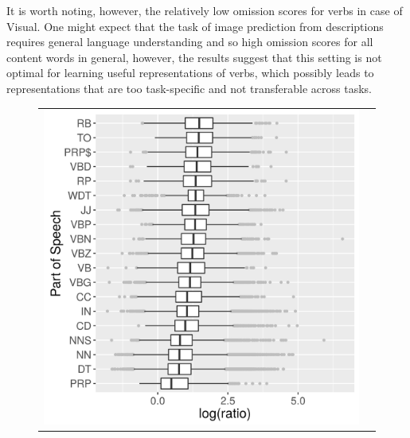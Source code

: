 It is worth noting, however, the relatively low omission scores for verbs in case \label{edit:generality}
of {\sc Visual}. One might expect that the task of image prediction from
descriptions requires general language understanding and so high omission
scores for all content words in general, however, the results
suggest that this setting is not optimal for learning useful representations of verbs,
which possibly leads to representations that are too task-specific 
and not transferable across tasks. 

\begin{figure}[t]
  \centering
  \hspace*{-0.2in}
  \setlength{\tabcolsep}{0pt}
  \begin{tabular}{cc}
  \includegraphics[scale=0.55]{imaginet-omission-quotient-pos-boxplot.png} &

\end{tabular}
\end{figure}
